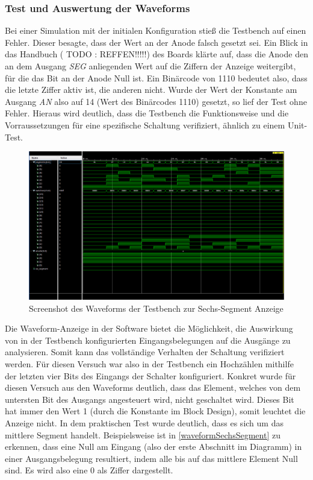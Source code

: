 \documentclass[11pt, a4paper]{article}
\begin{document}
\subsubsection*{Test und Auswertung der Waveforms}
Bei einer Simulation mit der initialen Konfiguration stieß die Testbench auf einen Fehler. Dieser besagte, dass der Wert an der Anode falsch gesetzt sei. Ein Blick in das Handbuch ( TODO : REFFEN!!!!!) des Boards klärte auf, dass die Anode den an dem Ausgang \textit{SEG} anliegenden Wert auf die Ziffern der Anzeige weitergibt, für die das Bit an der Anode Null ist. Ein Binärcode von 1110 bedeutet also, dass die letzte Ziffer aktiv ist, die anderen nicht.
Wurde der Wert der Konstante am Ausgang \textit{AN} also auf 14 (Wert des Binärcodes 1110) gesetzt, so lief der Test ohne Fehler.
Hieraus wird deutlich, dass die Testbench die Funktionsweise und die Vorraussetzungen für eine spezifische Schaltung verifiziert, ähnlich zu einem Unit-Test.
\begin{figure}[htb]    
    \centering
    \includegraphics[width=\linewidth]{versuch1Data/waveform1.png}
    \caption{Screenshot des Waveforms der Testbench zur Sechs-Segment Anzeige}
    \label{waveformSechsSegment}        
\end{figure}
Die Waveform-Anzeige in der Software bietet die Möglichkeit, die Auswirkung von in der Testbench konfigurierten Eingangsbelegungen auf die Ausgänge zu analysieren. Somit kann das vollständige Verhalten der Schaltung verifiziert werden.
Für diesen Versuch war also in der Testbench ein Hochzählen mithilfe der letzten vier Bits des Eingangs der Schalter konfiguriert.
Konkret wurde für diesen Versuch aus den Waveforms deutlich, dass das Element, welches von dem untersten Bit des Ausgangs angesteuert wird, nicht geschaltet wird. Dieses Bit hat immer den Wert 1 (durch die Konstante im Block Design), somit leuchtet die Anzeige nicht. In dem praktischen Test wurde deutlich, dass es sich um das mittlere Segment handelt.
Beispielsweise ist in \autoref{waveformSechsSegment} zu erkennen, dass eine Null am Eingang (also der erste Abschnitt im Diagramm) in einer Ausgangsbelegung resultiert, indem alle bis auf das mittlere Element Null sind. Es wird also eine 0 als Ziffer dargestellt.
\end{document}
